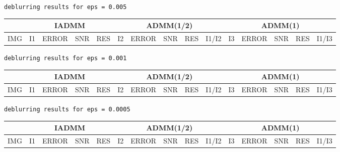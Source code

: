 \documentclass[a4paper]{article}
\begin{document}
  \small
  \begin{center}{\tt deblurring results for eps = 0.005}\end{center}
  {\tt \noindent\begin{tabular}{|r|rrrr|rrrrr|rrrrr|}
    \cline{2-15}
    \multicolumn{1}{c|}{} & \multicolumn{4}{c|}{IADMM}
        & \multicolumn{5}{c|}{ADMM(1/2)} & \multicolumn{5}{c|}{ADMM(1)}\\
    \hline
    \rowcolor[gray]{0.9}
    IMG & I1 & ERROR & SNR & RES & I2 & ERROR & SNR & RES & I1/I2 & I3 & ERROR & SNR & RES & I1/I3 \\
    
    \hline
  \end{tabular}}

  \bigskip
  \begin{center}{\tt deblurring results for eps = 0.001}\end{center}
  {\tt \noindent\begin{tabular}{|r|rrrr|rrrrr|rrrrr|}
    \cline{2-15}
    \multicolumn{1}{c|}{} & \multicolumn{4}{c|}{IADMM}
        & \multicolumn{5}{c|}{ADMM(1/2)} & \multicolumn{5}{c|}{ADMM(1)}\\
    \hline
    \rowcolor[gray]{0.9}
    IMG & I1 & ERROR & SNR & RES & I2 & ERROR & SNR & RES & I1/I2 & I3 & ERROR & SNR & RES & I1/I3 \\
    
    \hline
  \end{tabular}}

  \bigskip
  \begin{center}{\tt deblurring results for eps = 0.0005}\end{center}
  {\tt \noindent\begin{tabular}{|r|rrrr|rrrrr|rrrrr|}
    \cline{2-15}
    \multicolumn{1}{c|}{} & \multicolumn{4}{c|}{IADMM}
        & \multicolumn{5}{c|}{ADMM(1/2)} & \multicolumn{5}{c|}{ADMM(1)}\\
    \hline
    \rowcolor[gray]{0.9}
    IMG & I1 & ERROR & SNR & RES & I2 & ERROR & SNR & RES & I1/I2 & I3 & ERROR & SNR & RES & I1/I3 \\
    
    \hline
  \end{tabular}}
\end{document}

